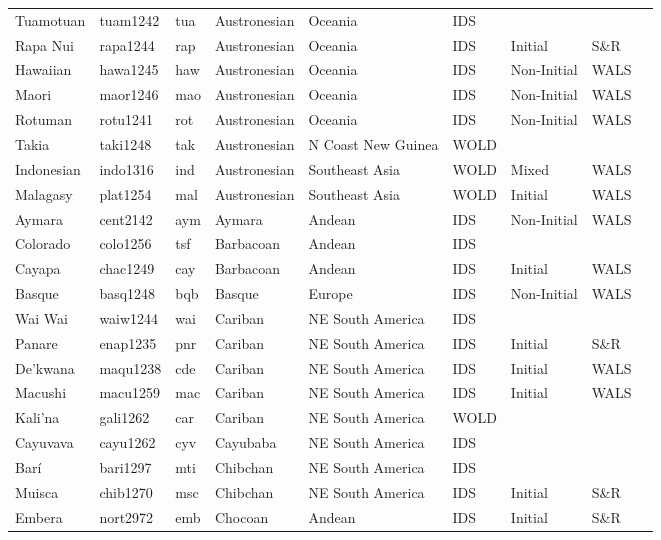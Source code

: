 \begin{longtable}{lllllllll}
  Tuamotuan & tuam1242 & tua & Austronesian & Oceania & IDS &  &  &  \\ 
  Rapa Nui & rapa1244 & rap & Austronesian & Oceania & IDS & Initial & S\&R & \cite[19]{feu_rapanui1996}\cite[73]{weberrobert_rapanui1988_o.pdf} \\ 
  Hawaiian & hawa1245 & haw & Austronesian & Oceania & IDS & Non-Initial & WALS &  \\ 
  Maori & maor1246 & mao & Austronesian & Oceania & IDS & Non-Initial & WALS &  \\ 
  Rotuman & rotu1241 & rot & Austronesian & Oceania & IDS & Non-Initial & WALS &  \\ 
  Takia & taki1248 & tak & Austronesian & N Coast New Guinea & WOLD &  &  &  \\ 
  Indonesian & indo1316 & ind & Austronesian & Southeast Asia & WOLD & Mixed & WALS &  \\ 
  Malagasy & plat1254 & mal & Austronesian & Southeast Asia & WOLD & Initial & WALS &  \\ 
  Aymara & cent2142 & aym & Aymara & Andean & IDS & Non-Initial & WALS &  \\ 
  Colorado & colo1256 & tsf & Barbacoan & Andean & IDS &  &  &  \\ 
  Cayapa & chac1249 & cay & Barbacoan & Andean & IDS & Initial & WALS &  \\ 
  Basque & basq1248 & bqb & Basque & Europe & IDS & Non-Initial & WALS &  \\ 
  Wai Wai & waiw1244 & wai & Cariban & NE South America & IDS &  &  &  \\ 
  Panare & enap1235 & pnr & Cariban & NE South America & IDS & Initial & S\&R & \cite[380]{payne-payne_panare2013.pdf} \\ 
  De'kwana & maqu1238 & cde & Cariban & NE South America & IDS & Initial & WALS &  \\ 
  Macushi & macu1259 & mac & Cariban & NE South America & IDS & Initial & WALS &  \\ 
  Kali'na & gali1262 & car & Cariban & NE South America & WOLD &  &  &  \\ 
  Cayuvava & cayu1262 & cyv & Cayubaba & NE South America & IDS &  &  &  \\ 
  Barí & bari1297 & mti & Chibchan & NE South America & IDS &  &  &  \\ 
  Muisca & chib1270 & msc & Chibchan & NE South America & IDS & Initial & S\&R & \cite[22]{ostler_muisca1994_o.pdf} \\ 
  Embera & nort2972 & emb & Chocoan & Andean & IDS & Initial & S\&R & \cite[13]{mortensen_northern-embera1999v2} \\ 

\end{longtable}
